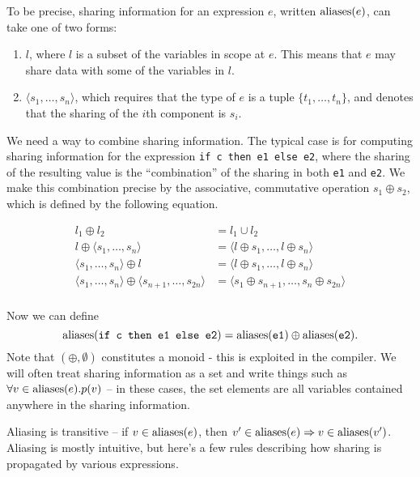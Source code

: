To be precise, sharing information for an expression $e$, written
$\textrm{aliases}(e)$, can take one of two forms:

\begin{enumerate}
\item $l$, where $l$ is a subset of the variables in scope at $e$.
  This means that $e$ may share data with some of the variables in
  $l$.

\item $\langle s_{1}, \ldots, s_{n} \rangle$, which requires that the
  type of $e$ is a tuple $\{t_{1}, \ldots, t_{n}\}$, and denotes that
  the sharing of the $i$th component is $s_{i}$.
\end{enumerate}

We need a way to combine sharing information.  The typical case is for
computing sharing information for the expression \texttt{if c then e1
  else e2}, where the sharing of the resulting value is the
``combination'' of the sharing in both \texttt{e1} and \texttt{e2}.
We make this combination precise by the associative, commutative
operation $s_{1} \oplus s_{2}$, which is defined by the following
equation.

\begin{align*}
  l_{1} \oplus l_{2} &= l_{1} \cup l_{2} \\
  l \oplus \langle s_{1}, \ldots, s_{n} \rangle &= \langle l \oplus s_1, \ldots, l \oplus s_n \rangle \\
   \langle s_{1}, \ldots, s_{n} \rangle \oplus l &= \langle l \oplus s_1, \ldots, l \oplus s_n \rangle \\
  \langle s_{1}, \ldots, s_{n} \rangle \oplus \langle s_{n+1}, \ldots, s_{2n} \rangle &= \langle s_{1} \oplus s_{n+1}, \ldots, s_{n} \oplus s_{2n} \rangle \\
\end{align*}

Now we can define
\[
\textrm{aliases}(\texttt{if c then e1 else e2}) = \textrm{aliases}(\texttt{e1}) \oplus \textrm{aliases}(\texttt{e2}).
\]
Note that $(\oplus, \emptyset)$ constitutes a monoid - this is
exploited in the \LO{} compiler.  We will often treat sharing
information as a set and write things such as $\forall
v\in\textrm{aliases}(e).p(v)$ -- in these cases, the set elements are all
variables contained anywhere in the sharing information.

Aliasing is transitive -- if $v\in\textrm{aliases}(e)$, then
$v'\in\textrm{aliases}(e)\Rightarrow v\in\textrm{aliases}(v')$.  Aliasing is mostly
intuitive, but here's a few rules describing how sharing is propagated
by various expressions.

